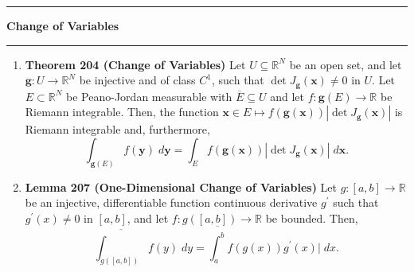 \documentclass[11pt]{article}
\newcommand{\bx}{\mathbf{x}}
\newcommand{\by}{\mathbf{y}}
\newcommand{\bfg}{\mathbf{g}}
\newcommand{\pjm}{Peano-Jordan measurable }
\newcommand{\Rint}{Riemann integrable }
\begin{document}
\hrule
{\Large \bf Change of Variables}
\vspace{1mm}
\hrule
\begin{enumerate}
\item \textbf{Theorem 204 (Change of Variables)}
Let $U \subseteq \mathbb{R}^N$ be an open set, and let
$\bfg: U \rightarrow \mathbb{R}^N$ be injective and of class $C^1$, such that
$\det J_{\bfg} (\bx) \neq 0$ in $U$. Let $E \subset \mathbb{R}^N$ be \pjm with
$\overline{E} \subseteq U$ and let $f: \bfg(E) \rightarrow \mathbb{R}$ be
Riemann integrable. Then, the function
$\bx \in E \mapsto f(\bfg(\bx))|\det J_{\bfg}(\bx)|$ is \Rint and,
furthermore,
\[\int_{\bfg(E)} f(\by) \; d\by
 = \int_E f(\bfg(\bx))|\det J_{\bfg}(\bx)| \; d\bx
.\]

\item \textbf{Lemma 207 (One-Dimensional Change of Variables)}
Let $g: [a,b] \rightarrow \mathbb{R}$ be an injective, differentiable function
continuous derivative $g^{\prime}$ such that $g^{\prime}(x) \neq 0$ in
$[a,b]$, and let $f: g([a,b]) \rightarrow \mathbb{R}$ be bounded. Then,
\[\overline{\int_{g([a,b])}} f(y) \; dy
 = \overline{\int_a^b} f(g(x))g^{\prime}(x)| \; dx
.\]

\end{enumerate}
\end{document}
